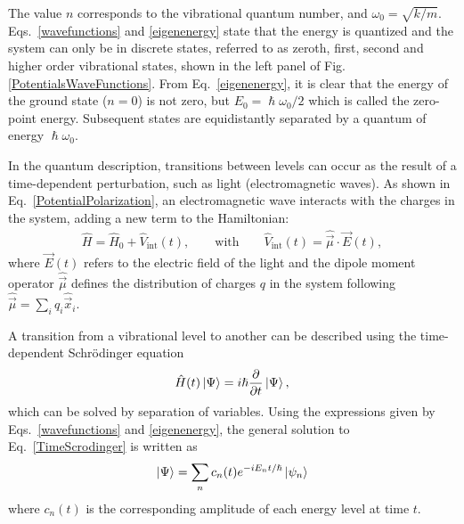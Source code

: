 The value $n$ corresponds to the vibrational quantum number, and $\omega_0 = \sqrt{k/m}$. Eqs.\ \ref{wavefunctions} and \ref{eigenenergy} state that the energy is quantized and the system can only be in discrete states, referred to as zeroth, first, second and higher order vibrational states, shown in the left panel of Fig. \ref{PotentialsWaveFunctions}. From Eq.\ \ref{eigenenergy}, it is clear that the energy of the ground state ($n=0$) is not zero, but $E_0 = \hslash \omega_0 /2$ which is called the zero-point energy. Subsequent states are equidistantly separated by a quantum of energy $\hslash \omega_0$. 







In the quantum description, transitions between levels can occur as the result of a time-dependent perturbation, such as light (electromagnetic waves). As shown in Eq.\ \ref{PotentialPolarization}, an electromagnetic wave interacts with the charges in the system, adding a new term to the Hamiltonian:
\begin{eqnarray}
\hat{H} = \hat{H}_0 + \hat{V}_\text{int}(t), \qquad \text{with} \qquad \hat{V}_\text{int}(t) = \hat{\vec{\mu}} \cdot \vec{E}(t),
\label{PerturbedHamiltonian}
\end{eqnarray} 
where $\vec{E}(t)$ refers to the electric field of the light and the dipole moment operator $\hat{\vec{\mu}}$ defines the distribution of charges $q$ in the system following $\hat{\vec{\mu}} = \sum_i q_i \hat{\vec{x}}_i$.


A transition from a vibrational level to another can be described using the time-dependent Schr\"odinger equation
\begin{eqnarray}
\hat{H} (t) \ket{\Psi} = i \hslash \frac{\partial}{\partial t} \ket{\Psi},
\label{TimeScrodinger}
\end{eqnarray} 
which can be solved by separation of variables. Using the expressions given by Eqs.\ \ref{wavefunctions} and \ref{eigenenergy}, the general solution to Eq.\ \ref{TimeScrodinger} is written as
\begin{eqnarray}
\ket{\Psi} = \sum_n c_n (t)  e^{  -i E_n t / \hslash  } \ket{\psi_n}
\label{GenSolTimeSchrodinger}
\end{eqnarray}
where $c_n (t)$ is the corresponding amplitude of each energy level at time $t$.


